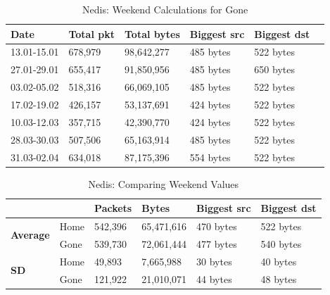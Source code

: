 \begin{table}[H]
    \centering
    \caption{Nedis: Weekend Calculations for Gone}
    \begin{tabular}{|l|l|l|l|l|l|}
        \hline
        \textbf{Date} & \textbf{Total pkt} & \textbf{Total bytes} & \textbf{Biggest src} & \textbf{Biggest dst} \\ \hline
        13.01-15.01   & 678,979            & 98,642,277           & 485 bytes            & 522 bytes            \\ \hline
        27.01-29.01   & 655,417            & 91,850,956           & 485 bytes            & 650 bytes            \\ \hline
        03.02-05.02   & 518,316            & 66,069,105           & 485 bytes            & 522 bytes            \\ \hline
        17.02-19.02   & 426,157            & 53,137,691           & 424 bytes            & 522 bytes            \\ \hline
        10.03-12.03   & 357,715            & 42,390,770           & 424 bytes            & 522 bytes            \\ \hline
        28.03-30.03   & 507,506            & 65,163,914           & 485 bytes            & 522 bytes            \\ \hline
        31.03-02.04   & 634,018            & 87,175,396           & 554 bytes            & 522 bytes            \\ \hline
    \end{tabular}
    \label{tab:NedisGoneWeekends}
\end{table}

\begin{table}[H]
    \centering
    \caption{Nedis: Comparing Weekend Values}
    \begin{tabular}{ll|l|l|l|l|}
        \cline{3-6}
        \textbf{}                                           & \textbf{} & \textbf{Packets} & \textbf{Bytes} & \textbf{Biggest src} & \textbf{Biggest dst} \\ \hline
        \multicolumn{1}{|l|}{\multirow{2}{*}{\textbf{Average}}} & Home      & 542,396          & 65,471,616     & 470 bytes            & 522 bytes            \\ \cline{2-6} 
        \multicolumn{1}{|l|}{}                              & Gone      & 539,730          & 72,061,444     & 477 bytes            & 540 bytes            \\ \hline
        \multicolumn{1}{|l|}{\multirow{2}{*}{\textbf{SD}}}  & Home      & 49,893           & 7,665,988      & 30 bytes             & 40 bytes             \\ \cline{2-6} 
        \multicolumn{1}{|l|}{}                              & Gone      & 121,922          & 21,010,071     & 44 bytes             & 48 bytes             \\ \hline
    \end{tabular}
    \label{tab:NedisWeekends}
\end{table}

